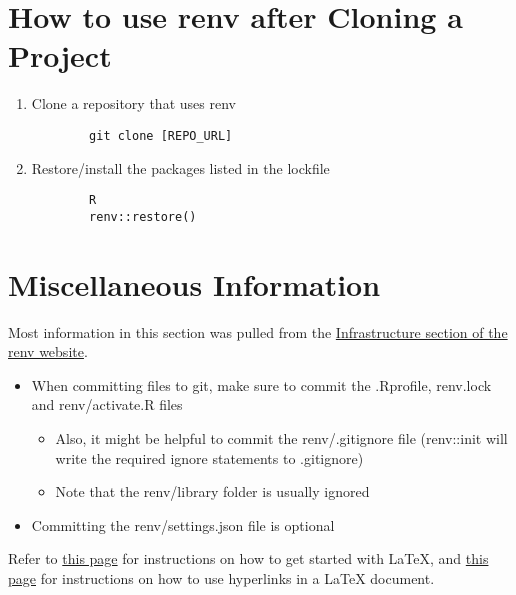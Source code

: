 \documentclass{article}
\begin{document}
\section{How to use renv after Cloning a Project}
\begin{enumerate}
    \item Clone a repository that uses renv
	\begin{verbatim}
	    git clone [REPO_URL]
    \end{verbatim}
    
    \item Restore/install the packages listed in the lockfile
	\begin{verbatim}
        R
        renv::restore()
	\end{verbatim}
\end{enumerate}


\section{Miscellaneous Information}
Most information in this section was pulled from the
\href{https://rstudio.github.io/renv/articles/renv.html#infrastructure}{Infrastructure section of the renv website}.

\begin{itemize}
    \item When committing files to git, make sure to commit the .Rprofile, renv.lock and renv/activate.R files
    \begin{itemize}
        \item Also, it might be helpful to commit the renv/.gitignore file (renv::init will write the required ignore statements to .gitignore)
        \item Note that the renv/library folder is usually ignored
    \end{itemize}
    \item Committing the renv/settings.json file is optional
\end{itemize}

\begin{flushleft}
Refer to \href{https://www.overleaf.com/learn/latex/Learn_LaTeX_in_30_minutes}{this page} for
instructions on how to get started with LaTeX, and \href{https://www.overleaf.com/learn/latex/Hyperlinks}{this page}
for instructions on how to use hyperlinks in a LaTeX document.
\end{flushleft}
\end{document}
